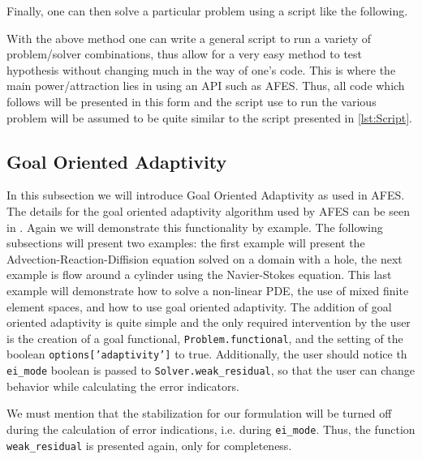     Finally, one can then solve a particular problem using a script like the
    following.
    

    With the above method one can write a general script to run a variety of
    problem/solver combinations, thus allow for a very easy method to test
    hypothesis without changing much in the way of one's code. This is where the
    main power/attraction lies in using an API such as AFES. Thus, all code
    which follows will be presented in this form and the script use to run the
    various problem will be assumed to be quite similar to the script presented
    in \autoref{lst:Script}.

\subsection{Goal Oriented Adaptivity} \label{sse:Adaptivity}

    In this subsection we will introduce Goal Oriented Adaptivity as used in
    AFES.  The details for the goal oriented adaptivity algorithm used by AFES
    can be seen in \cite{Foster2014e,Jansson2014a,Jansson2014b}. Again we will
    demonstrate this functionality by example. The following subsections will
    present two examples: the first example will present the
    Advection-Reaction-Diffision equation solved on a domain with a hole, the
    next example is flow around a cylinder using the Navier-Stokes equation.
    This last example will demonstrate how to solve a non-linear PDE, the use of
    mixed finite element spaces, and how to use goal oriented adaptivity.  The
    addition of goal oriented adaptivity is quite simple and the only required
    intervention by the user is the creation of a goal functional,
    \texttt{Problem.functional}, and the setting of the boolean
    \texttt{options['adaptivity']} to true.  Additionally, the user should
    notice th  \texttt{ei\_mode} boolean is passed to
    \texttt{Solver.weak\_residual}, so that the user can change behavior while
    calculating the error indicators.

    \begin{remark}
        We must mention that the stabilization for our formulation will be
        turned off during the calculation of error indications, i.e. during
        \texttt{ei\_mode}. Thus, the function \texttt{weak\_residual} is
        presented again, only for completeness.
    \end{remark}

